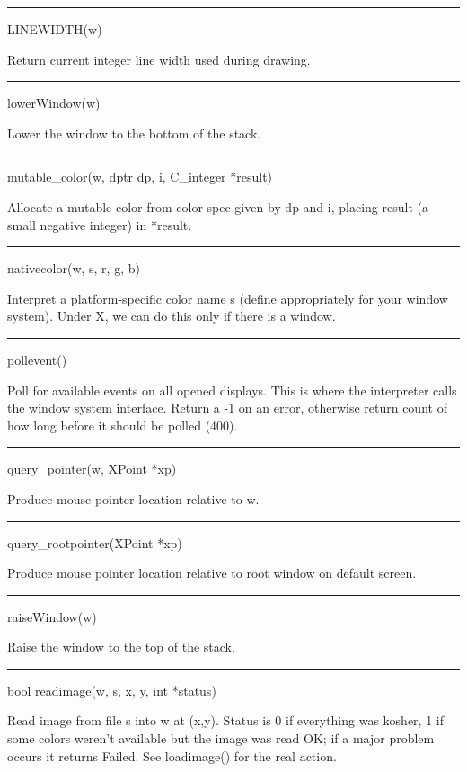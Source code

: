 \bigskip\hrule\vspace{0.1cm}
\noindent
LINEWIDTH(w)


Return current integer line width used during drawing.


\bigskip\hrule\vspace{0.1cm}
\noindent
lowerWindow(w)


Lower the window to the bottom of the stack.


\bigskip\hrule\vspace{0.1cm}
\noindent
mutable\_color(w, dptr dp, i, C\_integer *result)


Allocate a mutable color from color spec given by \textsf{dp} and
\textsf{i}, placing result (a small negative integer) in
\textsf{*result}.


\bigskip\hrule\vspace{0.1cm}
\noindent
nativecolor(w, s, r, g, b)


Interpret a platform-specific color name s (define appropriately for
your window system). Under X, we can do this only if there is a
window.


\bigskip\hrule\vspace{0.1cm}
\noindent
pollevent()


Poll for available events on all opened displays. This is where the
interpreter calls the window system interface. Return a -1 on an
error, otherwise return count of how long before it should be polled
(400).


\bigskip\hrule\vspace{0.1cm}
\noindent
query\_pointer(w, XPoint *xp)


Produce mouse pointer location relative to w.


\bigskip\hrule\vspace{0.1cm}
\noindent
query\_rootpointer(XPoint *xp)


Produce mouse pointer location relative to root window on default screen.


\bigskip\hrule\vspace{0.1cm}
\noindent
raiseWindow(w)


Raise the window to the top of the stack.


\bigskip\hrule\vspace{0.1cm}
\noindent
bool readimage(w, s, x, y, int *status)


Read image from file s into w at (x,y). Status is 0 if everything was
kosher, 1 if some colors weren't available but the image was read OK;
if a major problem occurs it returns Failed. See loadimage() for the
real action.


